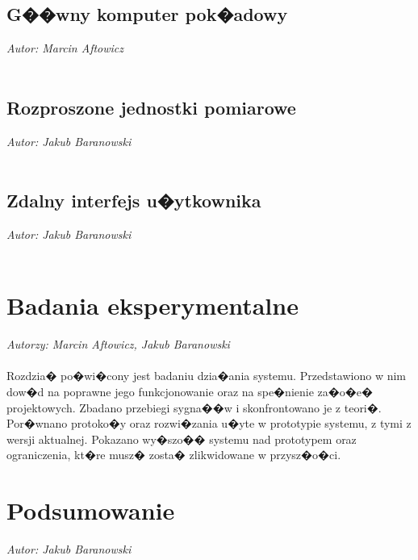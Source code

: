 \documentclass[]{myclass}
\begin{document}
%

\section{G��wny komputer pok�adowy}
\textit{Autor: Marcin Aftowicz}\\ \\

%

\section{Rozproszone jednostki pomiarowe}
\textit{Autor: Jakub Baranowski}\\ \\

%

\section{Zdalny interfejs u�ytkownika}
\textit{Autor: Jakub Baranowski}\\ \\

%

\chapter{Badania eksperymentalne} \label{ch:eksperyment}
\textit{Autorzy: Marcin Aftowicz, Jakub Baranowski}\\ \\

Rozdzia� po�wi�cony jest badaniu dzia�ania systemu. Przedstawiono w nim dow�d na poprawne jego funkcjonowanie oraz na spe�nienie za�o�e� projektowych. Zbadano przebiegi sygna��w i skonfrontowano je z teori�. Por�wnano protoko�y oraz rozwi�zania u�yte w prototypie systemu, z tymi z wersji aktualnej. Pokazano wy�szo�� systemu nad prototypem oraz ograniczenia, kt�re musz� zosta� zlikwidowane w przysz�o�ci.
%



\chapter{Podsumowanie}
\textit{Autor: Jakub Baranowski}\\ \\
%


\cleardoublepage
\appendix%

%
{}
\cleardoublepage


\end{document}
